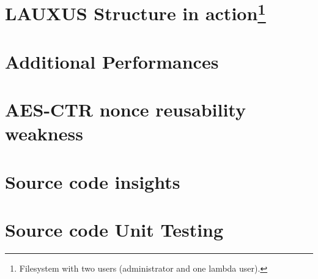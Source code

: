 \documentclass[../main.tex]{subfiles}
\begin{document}
\section{LAUXUS Structure in action\footnote{Filesystem with two users (administrator and one lambda user).}}
    \label{appendix:lauxus_structure}
    
\section{Additional Performances}
    \label{appendix:additional_perf}
    

\newpage    
\section{AES-CTR nonce reusability weakness}
    \label{appendix:ctr_nonce_weakness}
    
    
\section{Source code insights}
    \label{appendix:src_code_insights}
    
    
\section{Source code Unit Testing}
    \label{appendix:unit_testing}
    
\end{document}
